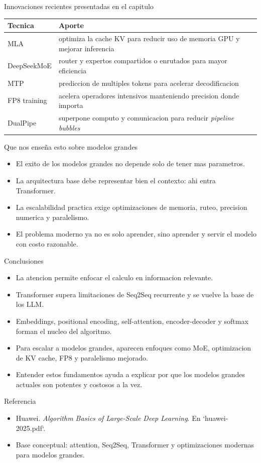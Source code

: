 \documentclass[aspectratio=169]{beamer}
\begin{document}
\begin{frame}{Innovaciones recientes presentadas en el capitulo}
  \small
  \begin{tabularx}{\textwidth}{>{\RaggedRight\arraybackslash}X>{\RaggedRight\arraybackslash}X}
    \toprule
    \textbf{Tecnica} & \textbf{Aporte} \\
    \midrule
    MLA & optimiza la cache KV para reducir uso de memoria GPU y mejorar inferencia \\
    DeepSeekMoE & router y expertos compartidos o enrutados para mayor eficiencia \\
    MTP & prediccion de multiples tokens para acelerar decodificacion \\
    FP8 training & acelera operadores intensivos manteniendo precision donde importa \\
    DualPipe & superpone computo y comunicacion para reducir \textit{pipeline bubbles} \\
    \bottomrule
  \end{tabularx}
\end{frame}

\begin{frame}{Que nos enseña esto sobre modelos grandes}
  \begin{itemize}
    \item El exito de los modelos grandes no depende solo de tener mas parametros.
    \item La arquitectura base debe representar bien el contexto: ahi entra Transformer.
    \item La escalabilidad practica exige optimizaciones de memoria, ruteo, precision numerica y paralelismo.
    \item El problema moderno ya no es solo aprender, sino aprender y servir el modelo con costo razonable.
  \end{itemize}
\end{frame}

\begin{frame}{Conclusiones}
  \begin{itemize}
    \item La atencion permite enfocar el calculo en informacion relevante.
    \item Transformer supera limitaciones de Seq2Seq recurrente y se vuelve la base de los LLM.
    \item Embeddings, positional encoding, self-attention, encoder-decoder y softmax forman el nucleo del algoritmo.
    \item Para escalar a modelos grandes, aparecen enfoques como MoE, optimizacion de KV cache, FP8 y paralelismo mejorado.
    \item Entender estos fundamentos ayuda a explicar por que los modelos grandes actuales son potentes y costosos a la vez.
  \end{itemize}
\end{frame}

\begin{frame}{Referencia}
  \small
  \begin{itemize}
    \item Huawei. \textit{Algorithm Basics of Large-Scale Deep Learning}. En `huawei-2025.pdf`.
    \item Base conceptual: attention, Seq2Seq, Transformer y optimizaciones modernas para modelos grandes.
  \end{itemize}
\end{frame}
\end{document}
